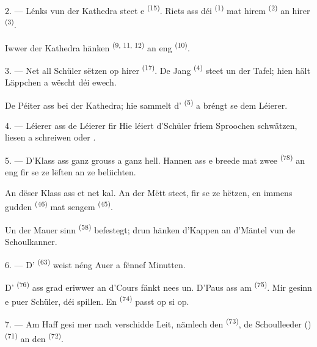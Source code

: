2. --- Lénks vun der Kathedra steet e  \textsuperscript{(15)}.
Riets ass déi  \textsuperscript{(1)} mat hirem
 \textsuperscript{(2)} an hirer  \textsuperscript{(3)}.

Iwwer der Kathedra hänken  \textsuperscript{(9, 11, 12)} an eng
 \textsuperscript{(10)}.

3. --- Net all Schüler sëtzen op hirer  \textsuperscript{(17)}. De Jang
\textsuperscript{(4)} steet un der Tafel; hien hält  Läppchen a wëscht déi
 ewech.

De Péiter ass bei der Kathedra; hie sammelt d'
\textsuperscript{(5)} a bréngt se dem Léierer.

4. ---  Léierer ass de Léierer fir  Hie léiert
d'Schüler friem Sproochen schwätzen, liesen a schreiwen  oder .

5. --- D'Klass ass ganz grouss a ganz hell. Hannen ass e breede  mat
zwee  \textsuperscript{(78)} an eng  fir se ze
lëften an ze beliichten.

An dëser Klass ass et net kal. An der Mëtt steet, fir se ze hëtzen, en immens gudden
 \textsuperscript{(46)} mat sengem  \textsuperscript{(45)}.

Un der Mauer sinn  \textsuperscript{(58)} befestegt; drun hänken
d'Kappen an d'Mäntel vun de Schoulkanner.

\VUsaut{5.2mm}
\VUsaut{3.6mm}

6. --- D' \textsuperscript{(63)} weist néng Auer a fënnef Minutten.

D' \textsuperscript{(76)} ass grad eriwwer an d'Cours fänkt nees un.
D'Paus ass am  \textsuperscript{(75)}. Mir gesinn e puer Schüler, déi
spillen. En  \textsuperscript{(74)} passt op si op.

7. --- Am Haff gesi mer nach verschidde Leit, nämlech den 
\textsuperscript{(73)}, de Schoulleeder ()
\textsuperscript{(71)} an den  \textsuperscript{(72)}.

